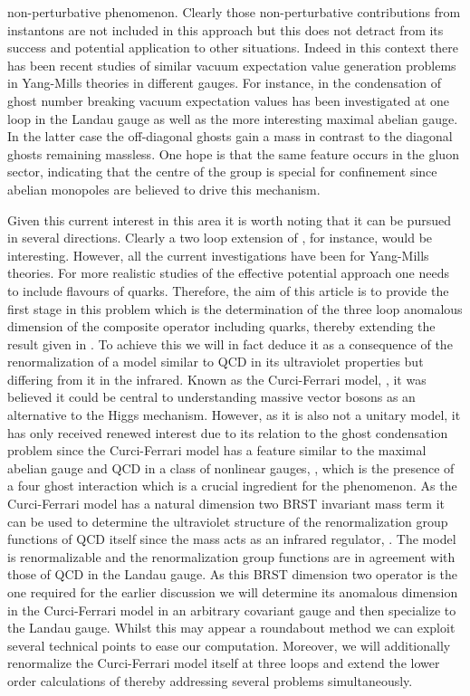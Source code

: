 \documentclass[a4paper,11pt]{article}
\providecommand{\half}{\mbox{\small{\myHighlight{$\frac{1}{2}$}\coordHE{}}}}
\providecommand{\Nf}{N_{\!f}}
\begin{document}
non-perturbative phenomenon. Clearly those non-perturbative contributions from 
instantons are not included in this approach but this does not detract from its
success and potential application to other situations. Indeed in this context 
there has been recent studies of similar vacuum expectation value generation 
problems in Yang-Mills theories in different gauges. For instance, in 
\cite{6,7,8,9,10,11,12,13} the condensation of ghost number breaking vacuum 
expectation values has been investigated at one loop in the Landau gauge as 
well as the more interesting maximal abelian gauge. In the latter case the 
off-diagonal ghosts gain a mass in contrast to the diagonal ghosts remaining 
massless. One hope is that the same feature occurs in the gluon sector, 
indicating that the centre of the group is special for confinement since 
abelian monopoles are believed to drive this mechanism.  

Given this current interest in this area it is worth noting that it can be
pursued in several directions. Clearly a two loop extension of \cite{12,13}, 
for instance, would be interesting. However, all the current investigations 
have been for Yang-Mills theories. For more realistic studies of the effective 
potential approach one needs to include \myHighlight{$\Nf$}\coordHE{} flavours of quarks. Therefore, 
the aim of this article is to provide the first stage in this problem which is 
the determination of the three loop anomalous dimension of the 
\myHighlight{$\half A^{a \, 2}_\mu$}\coordHE{} composite operator including quarks, thereby extending
the result given in \cite{2}. To achieve this we will in fact deduce it as a 
consequence of the renormalization of a model similar to QCD in its ultraviolet
properties but differing from it in the infrared. Known as the Curci-Ferrari 
model, \cite{17}, it was believed it could be central to understanding massive 
vector bosons as an alternative to the Higgs mechanism. However, as it is also 
not a unitary model, \cite{18,19,20,21,22,23} it has only received renewed 
interest due to its relation to the ghost condensation problem since the 
Curci-Ferrari model has a feature similar to the maximal abelian gauge and
QCD in a class of nonlinear gauges, \cite{24,25}, which is the presence of a
four ghost interaction which is a crucial ingredient for the phenomenon. As the
Curci-Ferrari model has a natural dimension two BRST invariant mass term it can
be used to determine the ultraviolet structure of the renormalization group 
functions of QCD itself since the mass acts as an infrared regulator, 
\cite{17,20,21,22,23,26,27}. The model is renormalizable and the 
renormalization group functions are in agreement with those of QCD in the 
Landau gauge. As this BRST dimension two operator is the one required for the 
earlier discussion we will determine its anomalous dimension in the 
Curci-Ferrari model in an arbitrary covariant gauge and then specialize to the 
Landau gauge. Whilst this may appear a roundabout method we can exploit several
technical points to ease our computation. Moreover, we will additionally 
renormalize the Curci-Ferrari model itself at three loops and extend the lower 
order calculations of \cite{17,21,28,29} thereby addressing several problems
simultaneously. 
\end{document}
